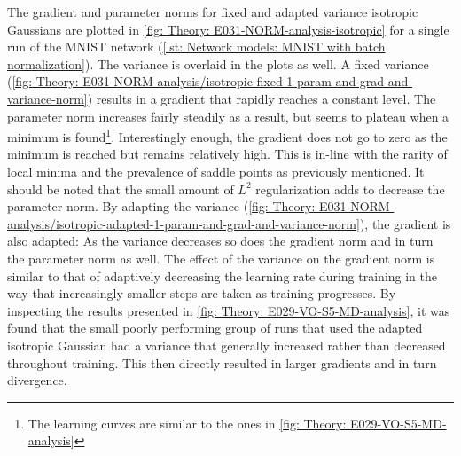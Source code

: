 The gradient and parameter norms for fixed and adapted variance isotropic Gaussians are plotted in \autoref{fig: Theory: E031-NORM-analysis-isotropic} for a single run of the \gls{MNIST} network (\autoref{lst: Network models: MNIST with batch normalization}). The variance is overlaid in the plots as well. 
A fixed variance (\ref{fig: Theory: E031-NORM-analysis/isotropic-fixed-1-param-and-grad-and-variance-norm}) results in a gradient that rapidly reaches a constant level. The parameter norm increases fairly steadily as a result, but seems to plateau when a minimum is found\footnote{The learning curves are similar to the ones in \autoref{fig: Theory: E029-VO-S5-MD-analysis}}. Interestingly enough, the gradient does not go to zero as the minimum is reached but remains relatively high. This is in-line with the rarity of local minima and the prevalence of saddle points as previously mentioned.
It should be noted that the small amount of $L^2$ regularization adds to decrease the parameter norm. By adapting the variance (\ref{fig: Theory: E031-NORM-analysis/isotropic-adapted-1-param-and-grad-and-variance-norm}), the gradient is also adapted: As the variance decreases so does the gradient norm and in turn the parameter norm as well. The effect of the variance on the gradient norm is similar to that of adaptively decreasing the learning rate during training in the way that increasingly smaller steps are taken as training progresses. By inspecting the results presented in \autoref{fig: Theory: E029-VO-S5-MD-analysis}, it was found that the small poorly performing group of runs that used the adapted isotropic Gaussian had a variance that generally increased rather than decreased throughout training. This then directly resulted in larger gradients and in turn divergence.

